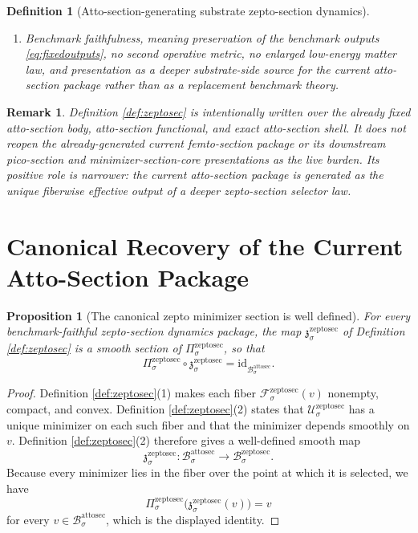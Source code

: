 \documentclass[11pt]{article}
\newcommand{\AttoSectionBody}[1]{\mathcal B_{#1}^{\mathrm{attosec}}}
\newcommand{\AttoSectionShell}[1]{\mathcal Z_{#1}^{\mathrm{attosec}}}
\newcommand{\ZeptoSectionBody}[1]{\mathcal B_{#1}^{\mathrm{zeptosec}}}
\newcommand{\ZeptoSectionProj}[1]{\Pi_{#1}^{\mathrm{zeptosec}}}
\newcommand{\ZeptoSectionFiber}[2]{\mathcal F_{#1}^{\mathrm{zeptosec}}(#2)}
\newcommand{\ZeptoSectionAttoMin}[1]{\mathfrak z_{#1}^{\mathrm{zeptosec}}}
\newcommand{\ZeptoSectionFunctional}[1]{\mathscr U_{#1}^{\mathrm{zeptosec}}}
\newcommand{\ZeptoSectionShell}[1]{\mathcal Z_{#1}^{\mathrm{zeptosec}}}
\newtheorem{definition}{Definition}
\newtheorem{proposition}{Proposition}
\newtheorem{remark}{Remark}
\begin{document}
\begin{definition}[Atto-section-generating substrate zepto-section dynamics]
\begin{enumerate}
\[\begin{array}{l}
    \ZeptoSectionFunctional{\sigma}(q)
    =
    \displaystyle\min_{r\in\ZeptoSectionFiber{\sigma}{\ZeptoSectionProj{\sigma}(q)}}
    \ZeptoSectionFunctional{\sigma}(r)
    \end{array}
    \right\},
    \]
    and
    \[
    \ZeptoSectionProj{\sigma}\big|_{\ZeptoSectionShell{\sigma}}
    :
    \ZeptoSectionShell{\sigma}
    \xrightarrow{\cong}
    \AttoSectionShell{\sigma}
    \]
    is a diffeomorphism.
    \item Benchmark faithfulness, meaning preservation of the benchmark outputs \eqref{eq:fixedoutputs}, no second operative metric, no enlarged low-energy matter law, and presentation as a deeper substrate-side source for the current atto-section package rather than as a replacement benchmark theory.
\end{enumerate}
\end{definition}

\begin{remark}
Definition \ref{def:zeptosec} is intentionally written over the already fixed atto-section body, atto-section functional, and exact atto-section shell. It does not reopen the already-generated current femto-section package or its downstream pico-section and minimizer-section-core presentations as the live burden. Its positive role is narrower: the current atto-section package is generated as the unique fiberwise effective output of a deeper zepto-section selector law.
\end{remark}

\section{Canonical Recovery of the Current Atto-Section Package}

\begin{proposition}[The canonical zepto minimizer section is well defined]
\label{prop:section}
For every benchmark-faithful zepto-section dynamics package, the map \(\ZeptoSectionAttoMin{\sigma}\) of Definition \ref{def:zeptosec} is a smooth section of \(\ZeptoSectionProj{\sigma}\), so that
\[
\ZeptoSectionProj{\sigma}\circ\ZeptoSectionAttoMin{\sigma}
=
\mathrm{id}_{\AttoSectionBody{\sigma}}.
\]
\end{proposition}

\begin{proof}
Definition \ref{def:zeptosec}(1) makes each fiber \(\ZeptoSectionFiber{\sigma}{v}\) nonempty, compact, and convex. Definition \ref{def:zeptosec}(2) states that \(\ZeptoSectionFunctional{\sigma}\) has a unique minimizer on each such fiber and that the minimizer depends smoothly on \(v\). Definition \ref{def:zeptosec}(2) therefore gives a well-defined smooth map
\[
\ZeptoSectionAttoMin{\sigma}:\AttoSectionBody{\sigma}\to\ZeptoSectionBody{\sigma}.
\]
Because every minimizer lies in the fiber over the point at which it is selected, we have
\[
\ZeptoSectionProj{\sigma}\bigl(\ZeptoSectionAttoMin{\sigma}(v)\bigr)=v
\]
for every \(v\in\AttoSectionBody{\sigma}\), which is the displayed identity.
\end{proof}
\end{document}
